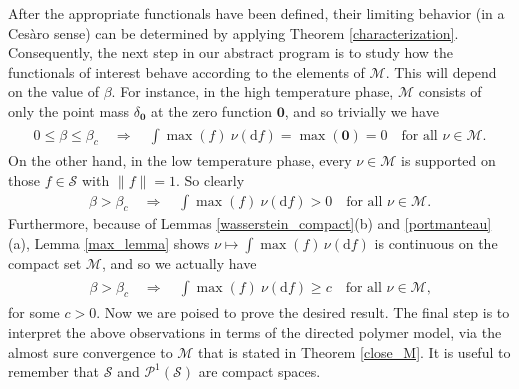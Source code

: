 \documentclass[11pt,reqno]{amsart}
\numberwithin{equation}{section}
\theoremstyle{definition}
\begin{document}
After the appropriate functionals have been defined, their limiting behavior (in a Ces\`aro sense) can be determined by applying Theorem \ref{characterization}.
Consequently, the next step in our abstract program is to study how the functionals of interest behave according to the elements of ${\mathcal{M}}$.
This will depend on the value of $\beta$.
For instance, in the high temperature phase, ${\mathcal{M}}$ consists of only the point mass $\delta_{{\boldsymbol {0}}}$ at the zero function ${{\boldsymbol {0}}}$, and so trivially we have
{\begin{align} \begin{split} {
0 \leq \beta \leq \beta_c \quad \Rightarrow \quad \int \max(f)\ \nu({\mathrm{d}} f) = \max({{\boldsymbol {0}}}) = 0 \quad \text{for all $\nu \in {\mathcal{M}}$.} \label{max_high}
} \end{split} \end{align}}
On the other hand, in the low temperature phase, every $\nu \in {\mathcal{M}}$ is supported on those $f \in {\mathcal{S}}$ with $\|f\| = 1$.
So clearly
{\begin{align*} {
\beta > \beta_c \quad \Rightarrow \quad \int \max(f)\ \nu({\mathrm{d}} f) > 0 \quad \text{for all $\nu \in {\mathcal{M}}$.}
} \end{align*}}
Furthermore, because of Lemmas \ref{wasserstein_compact}(b) and \ref{portmanteau}(a), Lemma \ref{max_lemma} shows $\nu \mapsto \int \max(f)\, \nu({\mathrm{d}} f)$ is continuous on the compact set ${\mathcal{M}}$, and so we actually have
{\begin{align} \begin{split} {
\beta > \beta_c \quad \Rightarrow \quad \int \max(f)\ \nu({\mathrm{d}} f) \geq c \quad \text{for all $\nu \in {\mathcal{M}}$,} \label{max_low}
} \end{split} \end{align}}
for some $c > 0$.
Now we are poised to prove the desired result.
The final step is to interpret the above observations in terms of the directed polymer model, via the almost sure convergence to ${\mathcal{M}}$ that is stated in Theorem \ref{close_M}.
It is useful to remember that ${\mathcal{S}}$ and ${\mathcal{P}}^1({\mathcal{S}})$ are compact spaces.
\end{document}
